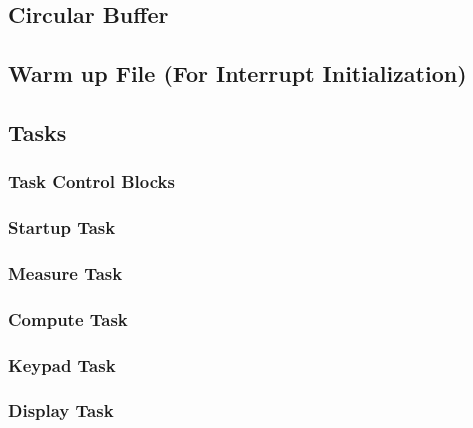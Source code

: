 \documentclass[12pt]{article} %
\begin{document}
    \subsection{Circular Buffer}
    
    

    \subsection{Warm up File (For Interrupt Initialization)}
    

    \subsection{Tasks}
    \subsubsection{Task Control Blocks}
    

    \subsubsection{Startup Task}
    
    

    \subsubsection{Measure Task}
    
    

    \subsubsection{Compute Task}
    
    

    \subsubsection{Keypad Task}
    
    

    \subsubsection{Display Task}
    
    
\end{document}
